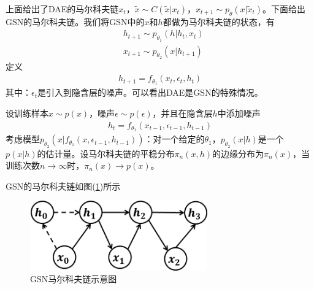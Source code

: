         \par
        上面给出了DAE的马尔科夫链$x_t$，$\tilde{x}\sim C(\tilde{x}|x_t)$，$x_{t+1} \sim p_\theta (x|\tilde{x}_t)$。下面给出GSN的马尔科夫链。我们将GSN中的$x$和$h$都做为马尔科夫链的状态，有
        \begin{align*}
        & h_{t+1}\sim p_{\theta_1} (h|h_t,x_t) \\
        & x_{t+1}\sim p_{\theta_2} (x|h_{t+1})
        \end{align*}
        定义
        \begin{align*}
        h_{t+1} = f_{\theta_1}(x_t,\epsilon_t,h_t)
        \end{align*}
        其中：$\epsilon_t$是引入到隐含层的噪声。可以看出DAE是GSN的特殊情况。
        \begin{theorem}
        设训练样本$x\sim p(x)$，噪声$\epsilon\sim p(\epsilon)$，并且在隐含层$h$中添加噪声
        \begin{align*}
        h_t = f_{\theta_1}(x_{t-1},\epsilon_{t-1},h_{t-1})
        \end{align*}
        考虑模型$p_{\theta_2}(x|f_{\theta_1}(x,\epsilon_{t-1},h_{t-1}))$：对一个给定的$\theta_1$，$p_{\theta_2}(x|h)$是一个$p(x|h)$的估计量。设马尔科夫链的平稳分布$\pi_n(x,h)$的边缘分布为$\pi_n(x)$，当训练次数$n\rightarrow \infty$时，$\pi_n(x)\rightarrow p(x)$。
        \end{theorem}
        \par
        GSN的马尔科夫链如图(\ref{fig:GSN马尔科夫链示意图})所示
            \begin{figure}[H]
            \centering
            \includegraphics[height=3cm]{images/GSN_Markov_chain_diagram.jpg}
            \caption{GSN马尔科夫链示意图}
            \label{fig:GSN马尔科夫链示意图}
            \end{figure}
